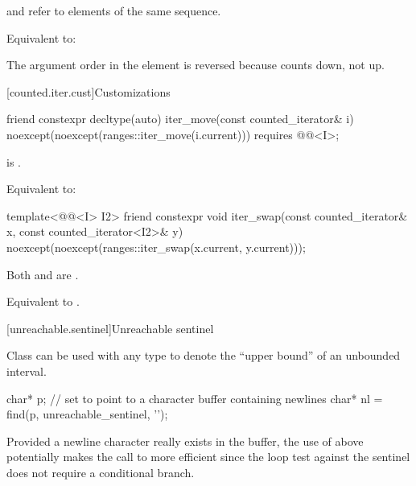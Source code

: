 \begin{itemdescr}
\pnum
\expects
{} and  refer to
elements of the same sequence.

\pnum
\effects
Equivalent to: 

\pnum
\begin{note}
The argument order in the \effects element is reversed
because  counts down, not up.
\end{note}
\end{itemdescr}

[counted.iter.cust]{Customizations}

%
\begin{itemdecl}
friend constexpr decltype(auto)
  iter_move(const counted_iterator& i)
    noexcept(noexcept(ranges::iter_move(i.current)))
    requires @@<I>;
\end{itemdecl}

\begin{itemdescr}
\pnum
\hardexpects
{} is .

\pnum
\effects
Equivalent to: 
\end{itemdescr}

%
\begin{itemdecl}
template<@@<I> I2>
  friend constexpr void
    iter_swap(const counted_iterator& x, const counted_iterator<I2>& y)
      noexcept(noexcept(ranges::iter_swap(x.current, y.current)));
\end{itemdecl}

\begin{itemdescr}
\pnum
\hardexpects
Both  and  are .

\pnum
\effects
Equivalent to .
\end{itemdescr}

[unreachable.sentinel]{Unreachable sentinel}

%
\pnum
Class  can be used with
any  type
to denote the ``upper bound'' of an unbounded interval.

\pnum
\begin{example}
\begin{codeblock}
char* p;
// set  to point to a character buffer containing newlines
char* nl = find(p, unreachable_sentinel, '\n');
\end{codeblock}

Provided a newline character really exists in the buffer, the use of
 above potentially makes the call to  more
efficient since the loop test against the sentinel does not require a
conditional branch.
\end{example}

